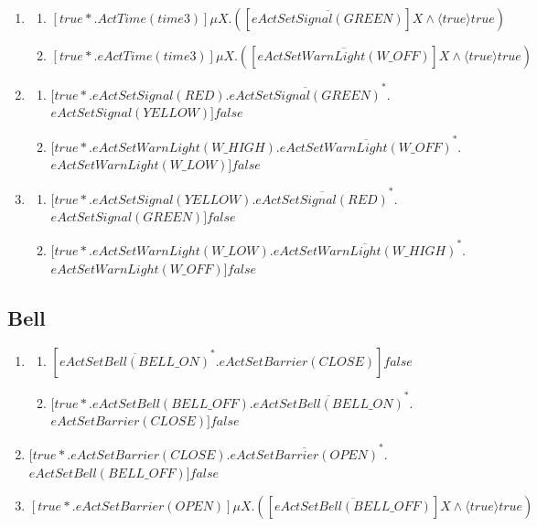 \documentclass[10pt,a4paper]{article}
\begin{document}
\begin{enumerate}[resume]
\begin{enumerate}
    \end{enumerate}
\item
	\begin{enumerate}
		\item $[true*.ActTime(time3)]\mu X.([\overline{eActSetSignal(GREEN)}]X \wedge \langle true\rangle  true)$
		\item $[true*.eActTime(time3)]\mu X.([\overline{eActSetWarnLight(W\_OFF)}]X \wedge \langle true\rangle  true)$
    \end{enumerate}
\item
	\begin{enumerate}
		\item $[true*.eActSetSignal(RED).\overline{eActSetSignal(GREEN)}^*. $\\$ eActSetSignal(YELLOW)]false$
		\item $[true*.eActSetWarnLight(W\_HIGH).\overline{eActSetWarnLight(W\_OFF)}^*. $\\$ eActSetWarnLight(W\_LOW)]false$
	\end{enumerate}
\item
	\begin{enumerate}
	\item $[true*.eActSetSignal(YELLOW).\overline{eActSetSignal(RED)}^*. $\\$ eActSetSignal(GREEN)]false$
	\item $[true*.eActSetWarnLight(W\_LOW).\overline{eActSetWarnLight(W\_HIGH)}^*. $\\$ eActSetWarnLight(W\_OFF)]false$
	\end{enumerate}
\end{enumerate}
\subsection{Bell}
\begin{enumerate}[resume]
\item 
	\begin{enumerate}
    \item $[\overline{eActSetBell(BELL\_ON)}^*.eActSetBarrier(CLOSE)]false$
    \item $[true*.eActSetBell(BELL\_OFF).\overline{eActSetBell(BELL\_ON)}^*. $\\$ eActSetBarrier(CLOSE)]false$
    \end{enumerate}
\item $[true*.eActSetBarrier(CLOSE).\overline{eActSetBarrier(OPEN)}^*. $\\$ eActSetBell(BELL\_OFF)]false$
\item $[true*.eActSetBarrier(OPEN)]\mu X.([\overline{eActSetBell(BELL\_OFF)}]X \wedge \langle true \rangle true)$
\end{enumerate}
\end{document}
